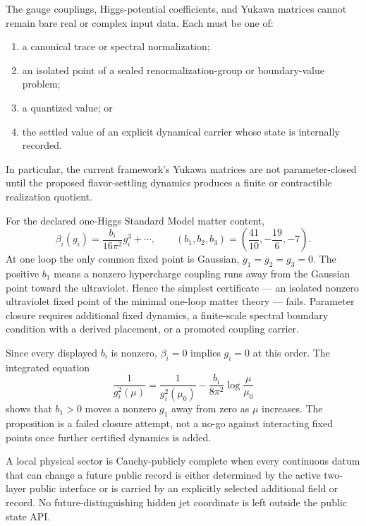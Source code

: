 \begin{corollary}
The gauge couplings, Higgs-potential coefficients, and Yukawa matrices cannot remain
bare real or complex input data.  Each must be one of:
\begin{enumerate}[label=\textup{(\alph*)},leftmargin=2.2em]
\item a canonical trace or spectral normalization;
\item an isolated point of a sealed renormalization-group or boundary-value problem;
\item a quantized value; or
\item the settled value of an explicit dynamical carrier whose state is internally
      recorded.
\end{enumerate}
In particular, the current framework's Yukawa matrices are not parameter-closed
until the proposed flavor-settling dynamics produces a finite or contractible
realization quotient.
\end{corollary}

\begin{proposition}
\label{prop:one-loop-fixed-point-attempt}
For the declared one-Higgs Standard Model matter content,
\[
 \beta_i(g_i)=\frac{b_i}{16\pi^2}g_i^3+\cdots,
 \qquad
 (b_1,b_2,b_3)=\left(\frac{41}{10},-\frac{19}{6},-7\right).
\]
At one loop the only common fixed point is Gaussian, \(g_1=g_2=g_3=0\).  The
positive \(b_1\) means a nonzero hypercharge coupling runs away from the Gaussian
point toward the ultraviolet.  Hence the simplest certificate --- an isolated
nonzero ultraviolet fixed point of the minimal one-loop matter theory --- fails.
Parameter closure requires additional fixed dynamics, a finite-scale spectral
boundary condition with a derived placement, or a promoted coupling carrier.
\end{proposition}

\begin{proofsketch}
Since every displayed \(b_i\) is nonzero, \(\beta_i=0\) implies \(g_i=0\) at this
order.  The integrated equation
\[
 \frac1{g_i^2(\mu)}
 =
 \frac1{g_i^2(\mu_0)}
 -\frac{b_i}{8\pi^2}\log\frac{\mu}{\mu_0}
\]
shows that \(b_1>0\) moves a nonzero \(g_1\) away from zero as \(\mu\) increases.
The proposition is a failed closure attempt, not a no-go against interacting fixed
points once further certified dynamics is added.
\end{proofsketch}

\begin{definition}
A local physical sector is Cauchy-publicly complete when every continuous datum that
can change a future public record is either determined by the active two-layer public
interface or is carried by an explicitly selected additional field or record.  No
future-distinguishing hidden jet coordinate is left outside the public state API.
\end{definition}

